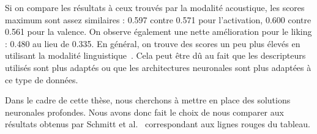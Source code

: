 Si on compare les résultats à ceux trouvés par la modalité acoustique, les scores maximum sont assez similaires : 0.597 contre 0.571 pour l'activation, 0.600 contre 0.561 pour la valence. On observe également une nette amélioration pour le liking : 0.480 au lieu de 0.335. En général, on trouve des scores un peu plus élevés en utilisant la modalité linguistique~\cite{Gunes2013}. Cela peut être dû au fait que les descripteurs utilisés sont plus adaptés ou que les architectures neuronales sont plus adaptées à ce type de données.

Dans le cadre de cette thèse, nous cherchons à mettre en place des solutions neuronales profondes. Nous avons donc fait le choix de nous comparer aux résultats obtenus par Schmitt et al.~\cite{Schmitt2019} correspondant aux lignes rouges du tableau.
%


